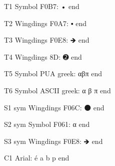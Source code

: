 \documentclass[11pt,a4paper]{article}
\begin{document}
T1 Symbol F0B7: • end

T2 Wingdings F0A7: ▪ end

T3 Wingdings F0E8: 🡺 end

T4 Wingdings 8D: ➋ end

T5 Symbol PUA greek: αβπ end

T6 Symbol ASCII greek: α β π end

S1 sym Wingdings F06C: ⚫ end

S2 sym Symbol F061: α end

S3 sym Wingdings F0E8: 🡺 end

C1 Arial: é a b p end
\end{document}
